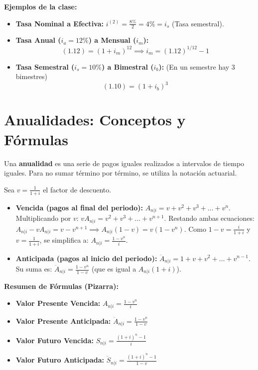 \documentclass[12pt,a4paper]{article}
\begin{document}
\textbf{Ejemplos de la clase:}
\begin{itemize}
    \item \textbf{Tasa Nominal a Efectiva:} \(i^{(2)} = \frac{8\%}{2} = 4\% = i_s\) (Tasa semestral).
    \item \textbf{Tasa Anual (\(i_a = 12\%\)) a Mensual (\(i_m\)):} 
    \[ (1.12) = (1 + i_m)^{12} \implies i_m = (1.12)^{1/12} - 1 \]
    \item \textbf{Tasa Semestral (\(i_s = 10\%\)) a Bimestral (\(i_b\)):} (En un semestre hay 3 bimestres)
    \[ (1.10) = (1 + i_b)^3 \]
\end{itemize}

\section{Anualidades: Conceptos y Fórmulas}

Una \textbf{anualidad} es una serie de pagos iguales realizados a intervalos de tiempo iguales. Para no sumar término por término, se utiliza la notación actuarial.

\begin{tcolorbox}[colback=rojopizarra!5!white, colframe=rojopizarra, title=Deducción de la Fórmula de Valor Presente (Pizarra)]
Sea \(v = \frac{1}{1+i}\) el factor de descuento.
\begin{itemize}
    \item \textbf{Vencida (pagos al final del periodo):} \(A_{n|i} = v + v^2 + v^3 + \dots + v^n\). \\
    Multiplicando por \(v\): \(v A_{n|i} = v^2 + v^3 + \dots + v^{n+1}\).
    Restando ambas ecuaciones: \(A_{n|i} - v A_{n|i} = v - v^{n+1} \implies A_{n|i}(1-v) = v(1-v^n)\).
    Como \(1-v = \frac{i}{1+i}\) y \(v = \frac{1}{1+i}\), se simplifica a: \(A_{n|i} = \frac{1 - v^n}{i}\).
    \item \textbf{Anticipada (pagos al inicio del periodo):} \(\ddot{A}_{n|i} = 1 + v + v^2 + \dots + v^{n-1}\). \\
    Su suma es: \(\ddot{A}_{n|i} = \frac{1 - v^n}{1 - v}\) (que es igual a \(A_{n|i}(1+i)\)).
\end{itemize}
\end{tcolorbox}

\textbf{Resumen de Fórmulas (Pizarra):}
\begin{itemize}
    \item \textbf{Valor Presente Vencida:} \(A_{n|i} = \frac{1 - v^n}{i}\)
    \item \textbf{Valor Presente Anticipada:} \(\ddot{A}_{n|i} = \frac{1 - v^n}{1 - v}\)
    \item \textbf{Valor Futuro Vencida:} \(S_{n|i} = \frac{(1+i)^n - 1}{i}\)
    \item \textbf{Valor Futuro Anticipada:} \(\ddot{S}_{n|i} = \frac{(1+i)^n - 1}{1 - v}\)
\end{itemize}
\end{document}
